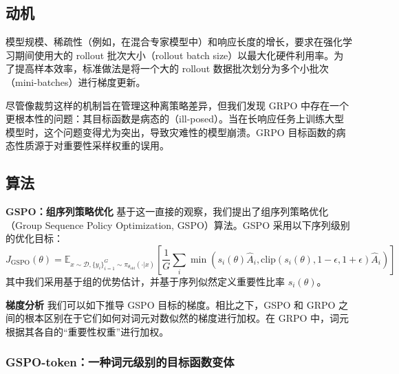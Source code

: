 \subsection{动机}
模型规模、稀疏性（例如，在混合专家模型中）和响应长度的增长，要求在强化学习期间使用大的 rollout 批次大小（rollout batch size）以最大化硬件利用率。为了提高样本效率，标准做法是将一个大的 rollout 数据批次划分为多个小批次（mini-batches）进行梯度更新。

尽管像裁剪这样的机制旨在管理这种离策略差异，但我们发现 GRPO 中存在一个更根本性的问题：其目标函数是病态的（ill-posed）。当在长响应任务上训练大型模型时，这个问题变得尤为突出，导致灾难性的模型崩溃。GRPO 目标函数的病态性质源于对重要性采样权重的误用。

\subsection{算法}
\textbf{GSPO：组序列策略优化} \quad 基于这一直接的观察，我们提出了组序列策略优化（Group Sequence Policy Optimization, GSPO）算法。GSPO 采用以下序列级别的优化目标：
\begin{equation}
J_{\text{GSPO}}(\theta) = \mathbb{E}_{x \sim \mathcal{D}, \{y_i\}_{i=1}^G \sim \pi_{\theta_{\text{old}}}(\cdot|x)} \left[ \frac{1}{G} \sum_i \min \left( s_i(\theta) \hat{A}_i, \text{clip}(s_i(\theta), 1-\epsilon, 1+\epsilon) \hat{A}_i \right) \right]
\end{equation}
其中我们采用基于组的优势估计，并基于序列似然定义重要性比率 $s_i(\theta)$。

\textbf{梯度分析} \quad 我们可以如下推导 GSPO 目标的梯度。相比之下，GSPO 和 GRPO 之间的根本区别在于它们如何对词元对数似然的梯度进行加权。在 GRPO 中，词元根据其各自的“重要性权重”进行加权。

\subsubsection{GSPO-token：一种词元级别的目标函数变体}

